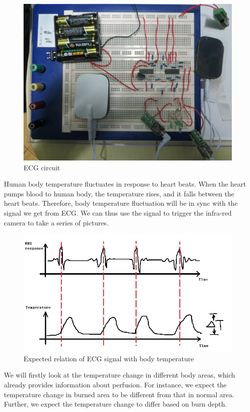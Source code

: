 \documentclass[paper=letter, fontsize=11pt]{scrartcl}
\numberwithin{equation}{section}		%
\numberwithin{figure}{section}			%
\numberwithin{table}{section}			%
\begin{document}
\begin{figure}[H]
    \centering
        \includegraphics[scale=0.1]{ECG_photo.jpg}
        \caption{ECG circuit}
\end{figure}

Human body temperature fluctuates in response to heart beats. When the heart pumps blood to human body, the temperature rises, 
and it falls between the heart beats. Therefore, body temperature fluctuation will be in sync with the signal we get from 
ECG. We can thus use the signal to trigger the infra-red camera to take a series of pictures. 
\begin{figure}[H]
    \centering
        \includegraphics[scale=0.7]{our_method.jpg}
        \caption{Expected relation of ECG signal with body temperature}
\end{figure}
We will firstly look at the 
temperature change in different body areas, which already provides information about perfusion. For instance, we expect the 
temperature change in burned area to be different from that in normal area. Further, we expect the temperature change to differ 
based on burn depth.
\end{document}
